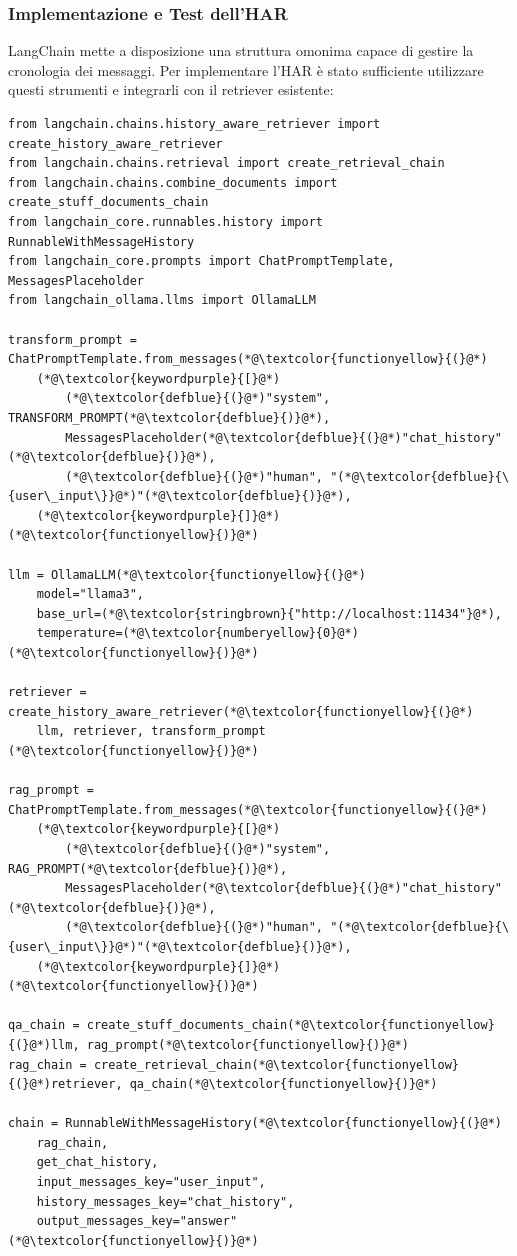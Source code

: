 \subsubsection{Implementazione e Test dell'HAR}
LangChain mette a disposizione una struttura omonima capace di gestire la cronologia dei messaggi. Per implementare l'HAR è stato sufficiente utilizzare questi strumenti e integrarli con il retriever esistente:
\begin{lstlisting}[label=lst:har, caption={Implementazione dell'History Aware Retriever}]
from langchain.chains.history_aware_retriever import create_history_aware_retriever
from langchain.chains.retrieval import create_retrieval_chain
from langchain.chains.combine_documents import create_stuff_documents_chain
from langchain_core.runnables.history import RunnableWithMessageHistory
from langchain_core.prompts import ChatPromptTemplate, MessagesPlaceholder
from langchain_ollama.llms import OllamaLLM

transform_prompt = ChatPromptTemplate.from_messages(*@\textcolor{functionyellow}{(}@*)
    (*@\textcolor{keywordpurple}{[}@*)
        (*@\textcolor{defblue}{(}@*)"system", TRANSFORM_PROMPT(*@\textcolor{defblue}{)}@*),
        MessagesPlaceholder(*@\textcolor{defblue}{(}@*)"chat_history"(*@\textcolor{defblue}{)}@*),
        (*@\textcolor{defblue}{(}@*)"human", "(*@\textcolor{defblue}{\{user\_input\}}@*)"(*@\textcolor{defblue}{)}@*),
    (*@\textcolor{keywordpurple}{]}@*)
(*@\textcolor{functionyellow}{)}@*)

llm = OllamaLLM(*@\textcolor{functionyellow}{(}@*)
    model="llama3",
    base_url=(*@\textcolor{stringbrown}{"http://localhost:11434"}@*),
    temperature=(*@\textcolor{numberyellow}{0}@*)
(*@\textcolor{functionyellow}{)}@*)

retriever = create_history_aware_retriever(*@\textcolor{functionyellow}{(}@*)
    llm, retriever, transform_prompt
(*@\textcolor{functionyellow}{)}@*)

rag_prompt = ChatPromptTemplate.from_messages(*@\textcolor{functionyellow}{(}@*)
    (*@\textcolor{keywordpurple}{[}@*)
        (*@\textcolor{defblue}{(}@*)"system", RAG_PROMPT(*@\textcolor{defblue}{)}@*),
        MessagesPlaceholder(*@\textcolor{defblue}{(}@*)"chat_history"(*@\textcolor{defblue}{)}@*),
        (*@\textcolor{defblue}{(}@*)"human", "(*@\textcolor{defblue}{\{user\_input\}}@*)"(*@\textcolor{defblue}{)}@*),
    (*@\textcolor{keywordpurple}{]}@*)
(*@\textcolor{functionyellow}{)}@*)

qa_chain = create_stuff_documents_chain(*@\textcolor{functionyellow}{(}@*)llm, rag_prompt(*@\textcolor{functionyellow}{)}@*)
rag_chain = create_retrieval_chain(*@\textcolor{functionyellow}{(}@*)retriever, qa_chain(*@\textcolor{functionyellow}{)}@*)

chain = RunnableWithMessageHistory(*@\textcolor{functionyellow}{(}@*)
    rag_chain,
    get_chat_history,
    input_messages_key="user_input",
    history_messages_key="chat_history",
    output_messages_key="answer"
(*@\textcolor{functionyellow}{)}@*)
\end{lstlisting}
